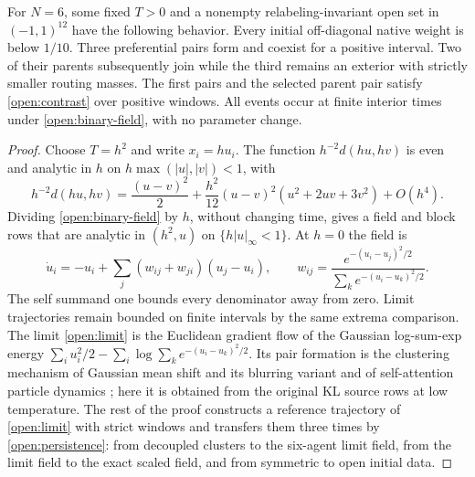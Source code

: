 For $N=6$, some fixed $T>0$ and a nonempty relabeling-invariant open set in $(-1,1)^{12}$ have the following behavior. Every initial off-diagonal native weight is below $1/10$. Three preferential pairs form and coexist for a positive interval. Two of their parents subsequently join while the third remains an exterior with strictly smaller routing masses. The first pairs and the selected parent pair satisfy \cref{open:contrast} over positive windows. All events occur at finite interior times under \cref{open:binary-field}, with no parameter change.
\begin{proof}
Choose $T=h^2$ and write $x_i=hu_i$. The function $h^{-2}d(hu,hv)$ is even and analytic in $h$ on $h\max(|u|,|v|)<1$, with
\begin{equation}
h^{-2}d(hu,hv)=\frac{(u-v)^2}{2}+\frac{h^2}{12}(u-v)^2(u^2+2uv+3v^2)+O(h^4).
\end{equation}
Dividing \cref{open:binary-field} by $h$, without changing time, gives a field and block rows that are analytic in $(h^2,u)$ on $\{h|u|_\infty<1\}$. At $h=0$ the field is
\begin{equation}
\dot u_i=-u_i+\sum_j(w_{ij}+w_{ji})(u_j-u_i),
\qquad
w_{ij}=\frac{e^{-(u_i-u_j)^2/2}}{\sum_k e^{-(u_i-u_k)^2/2}}.
\label{open:limit}
\end{equation}
The self summand one bounds every denominator away from zero. Limit trajectories remain bounded on finite intervals by the same extrema comparison. The limit \cref{open:limit} is the Euclidean gradient flow of the Gaussian log-sum-exp energy $\sum_iu_i^2/2-\sum_i\log\sum_ke^{-(u_i-u_k)^2/2}$. Its pair formation is the clustering mechanism of Gaussian mean shift and its blurring variant \citep{Cheng1995,CarreiraPerpinan2006} and of self-attention particle dynamics \citep{GeshkovskiEtAl2025}; here it is obtained from the original KL source rows at low temperature. The rest of the proof constructs a reference trajectory of \cref{open:limit} with strict windows and transfers them three times by \cref{open:persistence}: from decoupled clusters to the six-agent limit field, from the limit field to the exact scaled field, and from symmetric to open initial data.


\end{proof}
